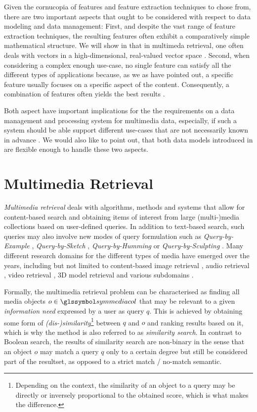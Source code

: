 Given the cornucopia of features and feature extraction techniques to chose from, there are two important aspects that ought to be considered with respect to data modeling and data management: First, and despite the vast range of feature extraction techniques, the resulting features often exhibit a comparatively simple mathematical structure. We will show in  that in multimeda retrieval, one often deals with vectors in a high-dimensional, real-valued vector space \cite{Zezula:2006Similarity}. Second, when considering a complex enough use-case, no single feature can satisfy all the different types of applications because, as we as have pointed out, a specific feature usually focuses on a specific aspect of the content. Consequently, a combination of features often yields the best results \cite{Deselaers:2008Features}.

Both aspect have important implications for the the requirements on a data management and processing system for multimedia data, especially, if such a system should be able support different use-cases that are not necessarily known in advance \cite{Smeulders:2000Content}. We would also like to point out, that both data models introduced in  are flexible enough to handle these two aspects.

\section{Multimedia Retrieval}
\label{section:multimedia_retrieval}

\emph{Multimedia retrieval} deals with algorithms, methods and systems that allow for content-based search and obtaining items of interest from large (multi-)media collections based on user-defined queries. In addition to text-based search, such queries may also involve new modes of query formulation such as \emph{Query-by-Example} \cite{Kelly:1995Query}, \emph{Query-by-Sketch} \cite{Cao:2010mind}, \emph{Query-by-Humming} \cite{Ghias:1995query} or \emph{Query-by-Sculpting} \cite{Boerlin:20203d}. Many different research domains for the different types of media have emerged over the years, including but not limited to content-based image retrieval \cite{Dharani:2013Survey}, audio retrieval \cite{Lu:2001Indexing}, video retrieval \cite{Hu:2011Survey}, 3D model retrieval \cite{Yang:2007Content} and various subdomains \cite{Murthy:2018Content}.

Formally, the multimedia retrieval problem can be characterised as finding all media objects $o \in \symmediacol$ that may be relevant to a given \emph{information need} expressed by a user as query $q$. This is achieved by obtaining some form of \emph{(dis-)similarity}\footnote{Depending on the context, the similarity of an object to a query may be directly or inversely proportional to the obtained score, which is what makes the difference.} between $q$ and $o$ and ranking results based on it, which is why the method is also referred to as \emph{similarity search}. In contrast to Boolean search, the results of similarity search are non-binary in the sense that an object $o$ may match a query $q$ only to a certain degree but still be considered part of the resultset, as opposed to a strict match / no-match semantic.

